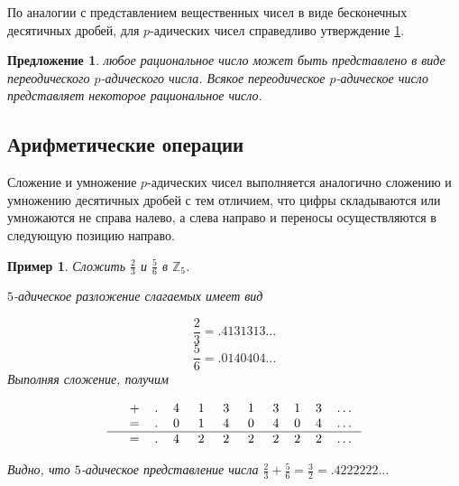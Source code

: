 \documentclass[master, och, diploma, times]{sty/SCWorks}
\theoremstyle{plain}
\newtheorem{proposition}{Предложение}[section]
\newtheorem{exmp}{Пример}[section]
\theoremstyle{definition}
\begin{document}
По аналогии с представлением вещественных чисел в виде бесконечных десятичных дробей, для $p$-адических чисел справедливо утверждение \ref{pros:numbers:1}.

\begin{proposition}\label{pros:numbers:1}
любое рациональное число может быть представлено в виде переодического $p$-адического числа. Всякое переодическое $p$-адическое число представляет некоторое рациональное число.
\end{proposition}

\subsection{Арифметические операции}

Сложение и умножение $p$-адических чисел выполняется аналогично сложению и умножению десятичных дробей с тем отличием, что цифры складываются или умножаются не справа налево, а слева направо и переносы осуществляются в следующую позицию направо.

\begin{exmp}
Сложить $\frac{2}{3}$ и $\frac{5}{6}$ в $\mathbb{Z}_5$.

\noindent $5$-адическое разложение слагаемых имеет вид

$$
\frac{2}{3}=.4131313\dots
$$
$$
\frac{5}{6}=.0140404\dots
$$
Выполняя сложение, получим

$$
\begin{tabular}{cccccccccccc}
& + & . & 4\; & 1\; & 3\; & 1\; & 3 & 1 & 3 & \dots \\
& = & . & 0\; & 1\; & 4\; & 0\; & 4 & 0 & 4 & \dots \\
\hline
& = & . & 4\; & 2\; & 2\; & 2\; & 2 & 2 & 2 & \dots
\end{tabular}
$$

\noindent Видно, что $5$-адическое представление числа $\frac{2}{3} + \frac{5}{6}=\frac{3}{2}=.4222222\dots$
\end{exmp}
\end{document}

